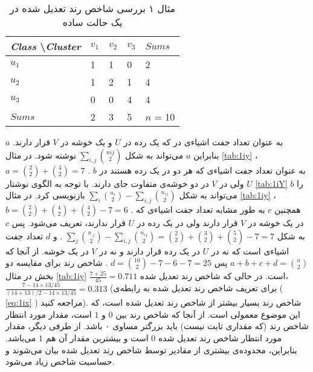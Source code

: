 \begin{table}[h]
\caption{
مثال ۱ بررسی شاخص رند تعدیل شده در یک حالت ساده
}
\centering
\bigskip
\begin{latin}
\begin{tabular}{l|lll|l}
\textit{Class} \textbackslash \textit{Cluster} & $v_1$    & $v_2$  & $v_3$  & $\mathit{Sums}$  	\\ \hline
$u_1$                        & 1 	& 1	 & 0	  & 2 		\\
$u_2$                        & 1 	& 2	 & 1	  & 4		\\
$u_3$                        & 0	& 0	 & 4	  & 4		\\ \hline
$\mathit{Sums}$                         & 2	& 3	 & 5	  & $n$ = 10
\end{tabular}
\end{latin}
\label{tab:1iy}
\end{table}

$a$
به عنوان تعداد جفت اشیاء‌ی در که یک رده در 
$U$
و یک خوشه در 
$V$
قرار دارند. بنابراین 
$a$
می‌تواند به شکل 
$\sum_{i,j} \binom{n{ij}}{2}$
نوشته شود. در مثال 
\autoref{tab:1iy}
،
$a = \binom{2}{2} + \binom{4}{2} = 7$
. 
$b$
به عنوان تعداد جفت اشیاءی که هر دو در یک رده هستند در 
$U$
ولی در 
$V$
در دو خوشه‌ی متفاوت جای دارند. 
با توجه به الگوی نوشتار 
\autoref{tab:1iY}
$b$ 
را می‌تواند به شکل 
$\sum_i \binom{n_i}{2} - \sum_{i,j} \binom{n_{ij}}{2}$
بازنویسی کرد. در مثال 
\autoref{tab:1iy}
،
$b = \binom{2}{2} + \binom{4}{2} + \binom{4}{2} - 7 = 6$%
. همچنین
 $c$
به طور مشابه تعداد جفت اشیاءی که در یک خوشه در 
$V$
قرار دارند ولی در یک رده در 
$U$
قرار ندارند، تعریف می‌شود. پس 
$c$
به شکل 
$\sum_j \binom{n_{.j}}{2} - \sum_{i,j} \binom{n_{ij}}{2} = \binom{2}{2} + \binom{3}{2} + \binom{5}{2} - 7 = 7$%
. و 
$d$
تعداد جفت اشیاءی است که نه در 
‌$U$
در یک رده قرار دارند و نه در 
$V$
در یک خوشه. از آنجا که 
$a+b+c+d = \binom{n}{2}$
پس
$d = \binom{10}{2} -7 -6 -7 = 25$%
. شاخص رند برای مقایسه دو بخش در مثال 
\autoref{tab:1iy}
$ \frac{7+25}{45} = 0.711 $
است. در حالی که شاخص رند تعدیل شده،
$ \frac{7 - 14 \times 13 / 45}{(14+13)/2 - 14 \times 13 / 45} = 0.313$
(برای تعریف شاخص رند تعدیل شده به رابطه‌ی (%
\ref{eq:1ix}%
) مراجعه کنید). شاخص رند بسیار بیشتر از شاخص رند تعدیل شده است، که این موضوع معمولی است. از آنجا که شاخص رند بین $0$ و $1$ است، مقدار مورد انتظار شاخص رند (که مقداری ثابت نیست) باید بزرگتر مساوی ۰ باشد. از طرفی دیگر، مقدار مورد انتظار شاخص رند تعدیل شده $0$ است و بیشترین مقدار آن هم $1$ می‌باشد. بنابراین، محدوده‌ی بیشتری از مقادیر توسط  شاخص رند تعدیل شده بیان می‌شوند و حساسیت شاخص زیاد می‌شود.

